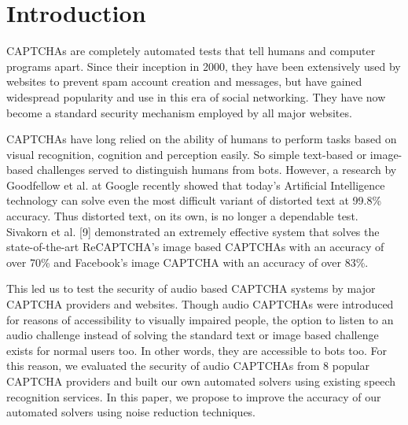 \section{Introduction}
\label{sec:intro}
  CAPTCHAs are completely automated tests that tell humans and computer programs apart. Since their inception in 2000, they have been extensively used by websites to prevent spam account creation and messages, but have gained widespread popularity and use in this era of social networking. They have now become a standard security mechanism employed by all major websites. \newline 

CAPTCHAs have long relied on the ability of humans to perform tasks based on visual recognition, cognition and perception easily. So simple text-based or image-based challenges served to distinguish humans from bots. However, a research by Goodfellow et al. at Google recently showed that today's Artificial Intelligence technology can solve even the most difficult variant of distorted text at 99.8\% accuracy. Thus distorted text, on its own, is no longer a dependable test. Sivakorn et al. [9] demonstrated an extremely effective system that solves the state-of-the-art ReCAPTCHA's image based CAPTCHAs with an accuracy of over 70\% and Facebook's image CAPTCHA with an accuracy of over 83\%. \newline

This led us to test the security of audio based CAPTCHA systems by major CAPTCHA providers and websites. Though audio CAPTCHAs were introduced for reasons of accessibility to visually impaired people, the option to listen to an audio challenge instead of solving the standard text or image based challenge exists for normal users too. In other words, they are accessible to bots too. For this reason, we evaluated the security of audio CAPTCHAs from 8 popular CAPTCHA providers and built our own automated solvers using existing speech recognition services. In this paper, we propose to improve the accuracy of our automated solvers using noise reduction techniques. \newline 